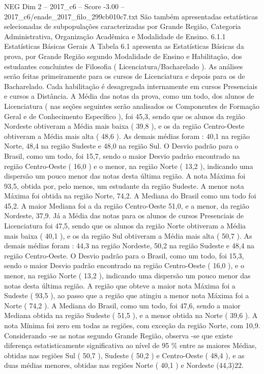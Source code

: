\begin{textsample}{NEG Dim 2 – 2017\_c6 – Score -3.00 – 2017\_c6/enade\_2017\_filo\_299cb010c7.txt}
São também apresentadas estatísticas selecionadas de subpopulações caracterizadas por Grande Região, Categoria Administrativa, Organização Acadêmica e Modalidade de Ensino. 6.1.1 Estatísticas Básicas Gerais A Tabela 6.1 apresenta as Estatísticas Básicas da prova, por Grande Região segundo Modalidade de Ensino e Habilitação, dos estudantes concluintes de Filosofia ( Licenciatura/Bacharelado ).
As análises serão feitas primeiramente para os cursos de Licenciatura e depois para os de Bacharelado.
Cada habilitação é desagregada internamente em cursos Presenciais e cursos a Distância.
A Média das notas da prova, como um todo, dos alunos de Licenciatura ( nas seções seguintes serão analisados os Componentes de Formação Geral e de Conhecimento Específico ), foi 45,3, sendo que os alunos da região Nordeste obtiveram a Média mais baixa ( 39,8 ), e os da região Centro-Oeste obtiveram a Média mais alta ( 48,6 ).
As demais médias foram : 40,1 na região Norte, 48,4 na região Sudeste e 48,0 na região Sul.
O Desvio padrão para o Brasil, como um todo, foi 15,7, sendo o maior Desvio padrão encontrado na região Centro-Oeste ( 16,0 ) e o menor, na região Norte ( 13,2 ), indicando uma dispersão um pouco menor das notas desta última região.
A nota Máxima foi 93,5, obtida por, pelo menos, um estudante da região Sudeste.
A menor nota Máxima foi obtida na região Norte, 74,2.
A Mediana do Brasil como um todo foi 45,2.
A maior Mediana foi a da região Centro-Oeste 51,0, e a menor, da região Nordeste, 37,9.
Já a Média das notas para os alunos de cursos Presenciais de Licenciatura foi 47,5, sendo que os alunos da região Norte obtiveram a Média mais baixa ( 40,1 ), e os da região Sul obtiveram a Média mais alta ( 50,7 ).
As demais médias foram : 44,3 na região Nordeste, 50,2 na região Sudeste e 48,4 na região Centro-Oeste.
O Desvio padrão para o Brasil, como um todo, foi 15,3, sendo o maior Desvio padrão encontrado na região Centro-Oeste ( 16,0 ), e o menor, na região Norte ( 13,2 ), indicando uma dispersão um pouco menor das notas desta última região.
A região que obteve a maior nota Máxima foi a Sudeste ( 93,5 ), ao passo que a região que atingiu a menor nota Máxima foi a Norte ( 74,2 ).
A Mediana do Brasil, como um todo, foi 47,6, sendo a maior Mediana obtida na região Sudeste ( 51,5 ), e a menor obtida na Norte ( 39,6 ).
A nota Mínima foi zero em todas as regiões, com exceção da região Norte, com 10,9.
Considerando -se as notas segundo Grande Região, observa -se que existe diferença estatisticamente significativa ao nível de 95 \% entre as maiores Médias, obtidas nas regiões Sul ( 50,7 ), Sudeste ( 50,2 ) e Centro-Oeste ( 48,4 ), e as duas médias menores, obtidas nas regiões Norte ( 40,1 ) e Nordeste (44,3)22.

\end{textsample}
